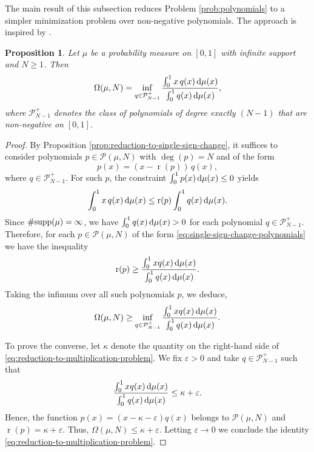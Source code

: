\documentclass[reqno, a4paper]{amsart}
\def\supp{{\rm supp}}
\renewcommand{\d}{\text{\rm d}}
\renewcommand{\r}{\operatorname{r}}
\theoremstyle{plain}
\newtheorem{proposition}[theorem]{Proposition}
\theoremstyle{definition}
\theoremstyle{remarkstyle}
\numberwithin{equation}{section}
\begin{document}
The main result of this subsection reduces Problem \ref{prob:polynomials} to a simpler minimization problem over non-negative polynomials. The approach is inspired by \cite[$\S 3.2$]{Carneiro2024SignUncertaintyBrangesSpaces}.

\begin{proposition}\label{prop:reduction-to-multiplication-problem}
Let $\mu$ be a probability measure on $[0,1]$ with infinite support and $N\geq 1$. Then
\begin{equation}\label{eq:reduction-to-multiplication-problem}
    \Omega(\mu, N) = \inf_{q \in \mathcal{P}_{N-1}^{+}} \frac{\int_{0}^{1} x\, q(x)\, \d\mu(x)}{\int_{0}^{1} q(x)\, \d\mu(x)},
\end{equation}
where $\mathcal{P}_{N-1}^{+}$ denotes the class of polynomials of degree exactly $(N-1)$ that are non-negative on $[0, 1]$. 
\end{proposition}

\begin{proof}

By Proposition \ref{prop:reduction-to-single-sign-change}, it suffices to consider polynomials $p \in \mathcal{P}(\mu, N)$ with $\deg(p) = N$ and of the form
\begin{equation}\label{eq:single-sign-change-polynomials}
    p(x) = (x - \r(p))\,q(x),
\end{equation}
where $q \in \mathcal{P}_{N-1}^{+}$. For such $p$, the constraint $\int_{0}^{1} p(x)\, \d\mu(x) \leq 0$ yields
\begin{equation*}
    \int_{0}^{1} x\, q(x)\, \d\mu(x) \leq \r(p) \int_{0}^{1} q(x)\, \d\mu(x).
\end{equation*}
Since $\#\supp(\mu)=\infty$, we have $\int_0^1 q(x)\,\d\mu(x)>0$ for each polynomial $q\in\mathcal{P}_{N-1}^+$. Therefore, for each $p\in \mathcal{P}(\mu, N)$ of the form \eqref{eq:single-sign-change-polynomials} we have the inequality
    \begin{equation*}
        \r(p)\geq \frac{\int_{0}^{1} x q(x)\, \d\mu(x)}{\int_{0}^{1}q(x)\, \d\mu(x)}.
    \end{equation*}
    Taking the infimum over all such polynomials $p$, we deduce, 
    \begin{equation*}
        \Omega(\mu, N)\geq \inf_{q\in \mathcal{P}_{N-1}^+} \frac{\int_{0}^{1} x q(x)\, \d\mu(x)}{\int_{0}^{1}q(x)\, \d\mu(x)}.
    \end{equation*}
    
    To prove the converse, let $\kappa$ denote the quantity on the right-hand side of \eqref{eq:reduction-to-multiplication-problem}. We fix $\varepsilon>0$ and take $q\in \mathcal{P}_{N-1}^{+}$ such that 
    \begin{equation*}
    \frac{\int_{0}^{1} x q(x)\, \d\mu(x)}{\int_{0}^{1}q(x)\, \d\mu(x)}\leq \kappa+\varepsilon.
    \end{equation*}
    Hence, the function $p(x)=(x-\kappa-\varepsilon)q(x)$ belongs to $\mathcal{P}(\mu, N)$ and $\r(p)=\kappa+\varepsilon$. Thus, $\Omega(\mu, N)\leq \kappa+\varepsilon$. Letting $\varepsilon\to 0$ we conclude the identity \eqref{eq:reduction-to-multiplication-problem}.
\end{proof}
\end{document}
